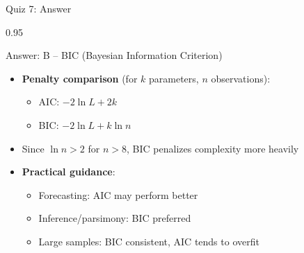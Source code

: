\documentclass[9pt, aspectratio=169, t]{beamer}
\begin{document}
\begin{frame}{Quiz 7: Answer}
    \begin{cminipage}{0.95\textwidth}
    \begin{exampleblock}{Answer: B -- BIC (Bayesian Information Criterion)}
        \begin{itemize}\setlength{\itemsep}{0pt}
            \item \textbf{Penalty comparison} (for $k$ parameters, $n$ observations):
            \begin{itemize}\setlength{\itemsep}{0pt}
                \item AIC: $-2\ln L + 2k$
                \item BIC: $-2\ln L + k\ln n$
            \end{itemize}
            \item Since $\ln n > 2$ for $n > 8$, BIC penalizes complexity more heavily
            \item \textbf{Practical guidance}:
            \begin{itemize}\setlength{\itemsep}{0pt}
                \item Forecasting: AIC may perform better
                \item Inference/parsimony: BIC preferred
                \item Large samples: BIC consistent, AIC tends to overfit
            \end{itemize}
        \end{itemize}
    \end{exampleblock}

    \end{cminipage}
\end{frame}
\end{document}
